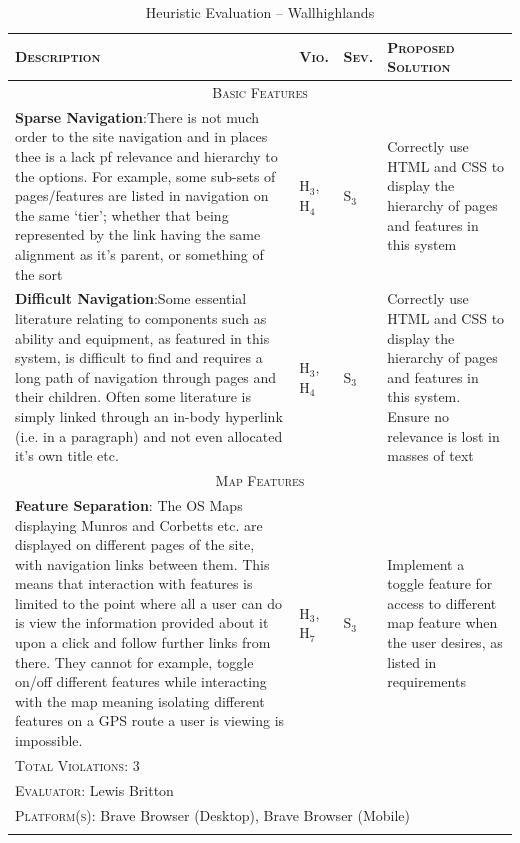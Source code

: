 \documentclass[11pt, english]{article}
\begin{document}
	\begin{center}
                \scriptsize
        	\begin{longtable}{p{7.5cm}p{0.5cm}p{0.5cm}p{4cm}}
                \textsc{Description} & \textsc{Vio.} & \textsc{Sev.} & \textsc{Proposed Solution}\\
                \hline
		\multicolumn{4}{c}{\textsc{Basic Features}}\\
		\hline
			\textbf{Sparse Navigation}:\newline There is not much order to the site navigation and in places thee is a lack pf relevance and hierarchy to the options. For example, some sub-sets of pages/features are listed in navigation on the same `tier'; whether that being represented by the link having the same alignment as it's parent, or something of the sort & $\mathrm{H_{3}}$, $\mathrm{H_{4}}$ & $\mathrm{S_{3}}$ & Correctly use HTML and CSS to display the hierarchy of pages and features in this system\\
			\textbf{Difficult Navigation}:\newline Some essential literature relating to components such as ability and equipment, as featured in this system, is difficult to find and requires a long path of navigation through pages and their children. Often some literature is simply linked through an in-body hyperlink (i.e. in a paragraph) and not even allocated it's own title etc. & $\mathrm{H_{3}}$, $\mathrm{H_{4}}$ & $\mathrm{S_{3}}$ & Correctly use HTML and CSS to display the hierarchy of pages and features in this system. Ensure no relevance is lost in masses of text\\
		\hline
		\multicolumn{4}{c}{\textsc{Map Features}}\\
		\hline
			\textbf{Feature Separation}: The OS Maps displaying Munros and Corbetts etc. are displayed on different pages of the site, with navigation links between them. This means that interaction with features is limited to the point where all a user can do is view the information provided about it upon a click and follow further links from there. They cannot for example, toggle on/off different features while interacting with the map meaning isolating different features on a GPS route a user is viewing is impossible. & $\mathrm{H_{3}}$, $\mathrm{H_{7}}$ & $\mathrm{S_{3}}$ & Implement a toggle feature for access to different map feature when the user desires, as listed in requirements\\
		\hline
                \multicolumn{4}{l}{\textsc{Total Violations}: 3}\\
                \multicolumn{4}{l}{\textsc{Evaluator}: Lewis Britton}\\
                \multicolumn{4}{l}{\textsc{Platform(s)}: Brave Browser (Desktop), Brave Browser (Mobile)}\\
                \hline
                \caption{Heuristic Evaluation -- Wallhighlands}
        \end{longtable}
        \end{center}
\end{document}
